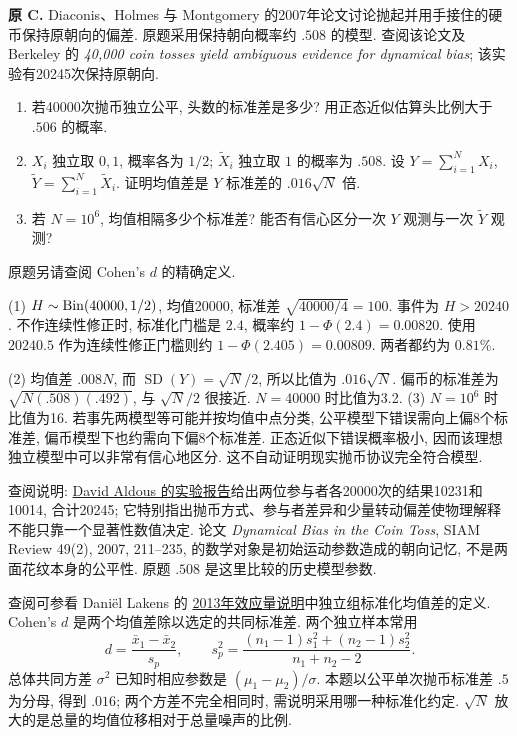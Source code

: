 \begin{exercise}\label{ex:P6.C}
\textbf{原 C.} Diaconis、Holmes 与 Montgomery 的2007年论文讨论抛起并用手接住的硬币保持原朝向的偏差. 原题采用保持朝向概率约 $.508$ 的模型. 查阅该论文及 Berkeley 的 \textit{40,000 coin tosses yield ambiguous evidence for dynamical bias}; 该实验有20245次保持原朝向.
\begin{enumerate}[label=\arabic*.]
\item\label{part:P6.C.1} 若40000次抛币独立公平, 头数的标准差是多少? 用正态近似估算头比例大于 $.506$ 的概率.
\item\label{part:P6.C.2} $X_i$ 独立取 $0,1$, 概率各为 $1/2$; $\widetilde X_i$ 独立取 $1$ 的概率为 $.508$. 设 $Y=\sum_{i=1}^N X_i$, $\widetilde Y=\sum_{i=1}^N\widetilde X_i$. 证明均值差是 $Y$ 标准差的 $.016\sqrt N$ 倍.
\item\label{part:P6.C.3} 若 $N=10^6$, 均值相隔多少个标准差? 能否有信心区分一次 $Y$ 观测与一次 $\widetilde Y$ 观测?
\end{enumerate}
原题另请查阅 Cohen's $d$ 的精确定义.
\end{exercise}
\begin{solution}\label{sol:P6.C}
(1) $H\sim\operatorname{Bin}(40000,1/2)$, 均值20000, 标准差 $\sqrt{40000/4}=100$. 事件为 $H>20240$. 不作连续性修正时, 标准化门槛是 $2.4$, 概率约 $1-\Phi(2.4)=0.00820$. 使用 $20240.5$ 作为连续性修正门槛则约 $1-\Phi(2.405)=0.00809$. 两者都约为 $0.81\%$.

(2) 均值差 $.008N$, 而 $\operatorname{SD}(Y)=\sqrt N/2$, 所以比值为 $.016\sqrt N$. 偏币的标准差为 $\sqrt{N(.508)(.492)}$, 与 $\sqrt N/2$ 很接近. $N=40000$ 时比值为3.2. (3) $N=10^6$ 时比值为16. 若事先两模型等可能并按均值中点分类, 公平模型下错误需向上偏8个标准差, 偏币模型下也约需向下偏8个标准差. 正态近似下错误概率极小, 因而该理想独立模型中可以非常有信心地区分. 这不自动证明现实抛币协议完全符合模型.

查阅说明: \href{https://www.stat.berkeley.edu/~aldous/Real-World/coin_tosses.html}{David Aldous 的实验报告}给出两位参与者各20000次的结果10231和10014, 合计20245; 它特别指出抛币方式、参与者差异和少量转动偏差使物理解释不能只靠一个显著性数值决定. 论文 \textit{Dynamical Bias in the Coin Toss}, SIAM Review 49(2), 2007, 211--235, 的数学对象是初始运动参数造成的朝向记忆, 不是两面花纹本身的公平性. 原题 $.508$ 是这里比较的历史模型参数.

查阅可参看 Daniël Lakens 的 \href{https://www.frontiersin.org/journals/psychology/articles/10.3389/fpsyg.2013.00863/full}{2013年效应量说明}中独立组标准化均值差的定义. Cohen's $d$ 是两个均值差除以选定的共同标准差. 两个独立样本常用
\[
 d=\frac{\bar x_1-\bar x_2}{s_p},\qquad
 s_p^2=\frac{(n_1-1)s_1^2+(n_2-1)s_2^2}{n_1+n_2-2}.
\]
总体共同方差 $\sigma^2$ 已知时相应参数是 $(\mu_1-\mu_2)/\sigma$. 本题以公平单次抛币标准差 $.5$ 为分母, 得到 $.016$; 两个方差不完全相同时, 需说明采用哪一种标准化约定. $\sqrt N$ 放大的是总量的均值位移相对于总量噪声的比例.
\end{solution}

